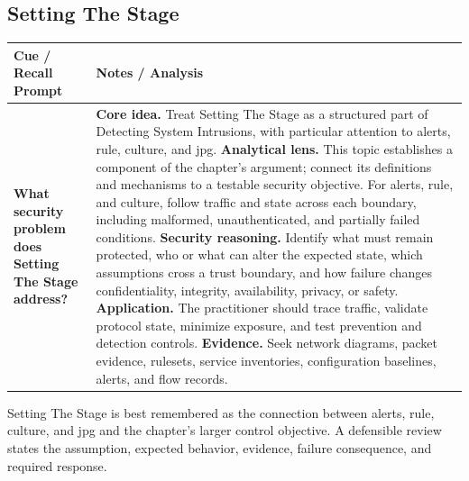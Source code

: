 \documentclass[11pt]{article}
\newcommand{\CornellHeader}{%
\rowcolor{Navy}\color{white}\bfseries Cue / Recall Prompt & \color{white}\bfseries Notes / Analysis\\\hline}
\newcommand{\CornellRow}[2]{%
\cellcolor{CueGray}\RaggedRight\textbf{#1} & \RaggedRight #2\\\hline}
\begin{document}
\subsection*{Setting The Stage}
\begin{longtable}{>{\RaggedRight\arraybackslash}p{}|>{\RaggedRight\arraybackslash}p{}}
\CornellHeader
\CornellRow{What security problem does Setting The Stage address?}{\textbf{Core idea.} Treat Setting The Stage as a structured part of Detecting System Intrusions, with particular attention to alerts, rule, culture, and jpg. \textbf{Analytical lens.} This topic establishes a component of the chapter's argument; connect its definitions and mechanisms to a testable security objective. For alerts, rule, and culture, follow traffic and state across each boundary, including malformed, unauthenticated, and partially failed conditions. \textbf{Security reasoning.} Identify what must remain protected, who or what can alter the expected state, which assumptions cross a trust boundary, and how failure changes confidentiality, integrity, availability, privacy, or safety. \textbf{Application.} The practitioner should trace traffic, validate protocol state, minimize exposure, and test prevention and detection controls. \textbf{Evidence.} Seek network diagrams, packet evidence, rulesets, service inventories, configuration baselines, alerts, and flow records.}
\end{longtable}
\begin{topicsummary}
Setting The Stage is best remembered as the connection between alerts, rule, culture, and jpg and the chapter's larger control objective. A defensible review states the assumption, expected behavior, evidence, failure consequence, and required response.
\end{topicsummary}
\end{document}
